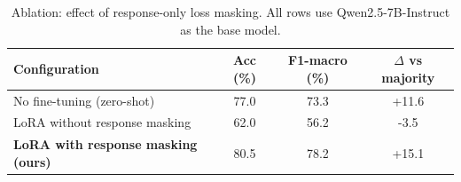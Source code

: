 \begin{table}[t]
\centering
\small
\caption{Ablation: effect of response-only loss masking. All rows use Qwen2.5-7B-Instruct as the base model.}
\label{tab:ablation}
\begin{tabular}{lccc}
\toprule
\textbf{Configuration} & \textbf{Acc (\%)} & \textbf{F1-macro (\%)} & \textbf{$\Delta$ vs majority} \\
\midrule
  No fine-tuning (zero-shot) & 77.0 & 73.3 & +11.6 \\
  LoRA without response masking & 62.0 & 56.2 & -3.5 \\
  \textbf{LoRA with response masking (ours)} & 80.5 & 78.2 & +15.1 \\
\bottomrule
\end{tabular}
\end{table}
